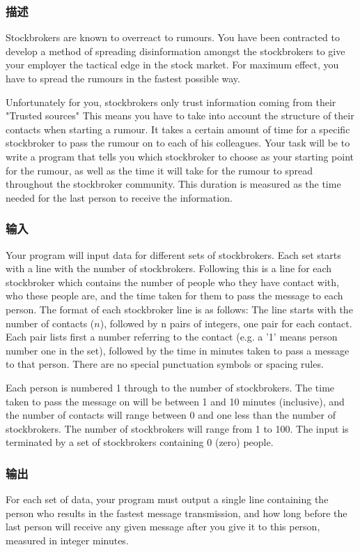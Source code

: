 \subsubsection{描述}
Stockbrokers are known to overreact to rumours. You have been contracted to develop a method of spreading disinformation amongst the stockbrokers to give your employer the tactical edge in the stock market. For maximum effect, you have to spread the rumours in the fastest possible way. 

Unfortunately for you, stockbrokers only trust information coming from their "Trusted sources" This means you have to take into account the structure of their contacts when starting a rumour. It takes a certain amount of time for a specific stockbroker to pass the rumour on to each of his colleagues. Your task will be to write a program that tells you which stockbroker to choose as your starting point for the rumour, as well as the time it will take for the rumour to spread throughout the stockbroker community. This duration is measured as the time needed for the last person to receive the information.

\subsubsection{输入}
Your program will input data for different sets of stockbrokers. Each set starts with a line with the number of stockbrokers. Following this is a line for each stockbroker which contains the number of people who they have contact with, who these people are, and the time taken for them to pass the message to each person. The format of each stockbroker line is as follows: The line starts with the number of contacts ($n$), followed by n pairs of integers, one pair for each contact. Each pair lists first a number referring to the contact (e.g. a '1' means person number one in the set), followed by the time in minutes taken to pass a message to that person. There are no special punctuation symbols or spacing rules. 

Each person is numbered 1 through to the number of stockbrokers. The time taken to pass the message on will be between 1 and 10 minutes (inclusive), and the number of contacts will range between 0 and one less than the number of stockbrokers. The number of stockbrokers will range from 1 to 100. The input is terminated by a set of stockbrokers containing 0 (zero) people. 

\subsubsection{输出}
For each set of data, your program must output a single line containing the person who results in the fastest message transmission, and how long before the last person will receive any given message after you give it to this person, measured in integer minutes. 


